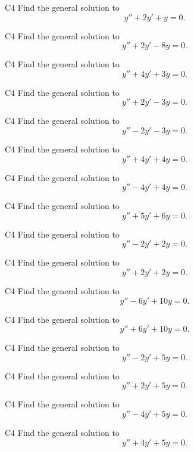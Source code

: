 \begin{problem}{C4}
Find the general solution to
\[
y'' + 2y' + y = 0.
\]
\end{problem}

\begin{problem}{C4}
Find the general solution to
\[
y'' + 2y' - 8y = 0.
\]
\end{problem}

\begin{problem}{C4}
Find the general solution to
\[
y'' + 4y' + 3y = 0.
\]
\end{problem}

\begin{problem}{C4}
Find the general solution to
\[
y'' + 2y' - 3y = 0.
\]
\end{problem}

\begin{problem}{C4}
Find the general solution to
\[
y'' - 2y' - 3y = 0.
\]
\end{problem}

\begin{problem}{C4}
Find the general solution to
\[
y'' + 4y' + 4y = 0.
\]

\end{problem}

\begin{problem}{C4}
Find the general solution to
\[
y'' - 4y' + 4y = 0.
\]
\end{problem}

\begin{problem}{C4}
Find the general solution to
\[
y'' + 5y' + 6y = 0.
\]
\end{problem}


\begin{problem}{C4}
Find the general solution to
\[
y'' - 2y' + 2y = 0.
\]
\end{problem}

\begin{problem}{C4}
Find the general solution to
\[
y'' + 2y' + 2y = 0.
\]
\end{problem}

\begin{problem}{C4}
Find the general solution to
\[
y'' - 6y' + 10y = 0.
\]
\end{problem}

\begin{problem}{C4}
Find the general solution to
\[
y'' + 6y' + 10y = 0.
\]
\end{problem}

\begin{problem}{C4}
Find the general solution to
\[
y'' - 2y' + 5y = 0.
\]
\end{problem}

\begin{problem}{C4}
Find the general solution to
\[
y'' + 2y' + 5y = 0.
\]
\end{problem}

\begin{problem}{C4}
Find the general solution to
\[
y'' - 4y' + 5y = 0.
\]
\end{problem}

\begin{problem}{C4}
Find the general solution to
\[
y'' + 4y' + 5y = 0.
\]
\end{problem}
